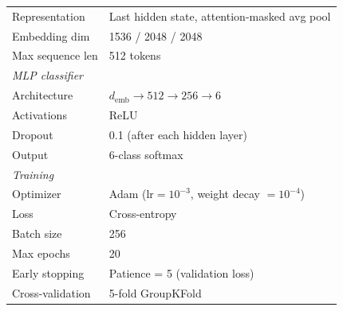 \begin{table}[t]
\begin{minipage}[t]{0.52\textwidth}
{\begin{tabular}{ll}
    Representation    & Last hidden state, attention-masked avg pool \\
    Embedding dim     & 1536 / 2048 / 2048 \\
    Max sequence len   & 512 tokens \\
    \midrule
    \multicolumn{2}{l}{\textit{MLP classifier}} \\
    Architecture      & $d_{\text{emb}} \to 512 \to 256 \to 6$ \\
    Activations       & ReLU \\
    Dropout           & 0.1 (after each hidden layer) \\
    Output            & 6-class softmax \\
    \midrule
    \multicolumn{2}{l}{\textit{Training}} \\
    Optimizer         & Adam ($\text{lr} = 10^{-3}$, weight decay $= 10^{-4}$) \\
    Loss              & Cross-entropy \\
    Batch size        & 256 \\
    Max epochs        & 20 \\
    Early stopping    & Patience = 5 (validation loss) \\
    Cross-validation  & 5-fold GroupKFold \\
    \bottomrule
  \end{tabular}%
  }
\end{minipage}
\end{table}

\begin{table}[t]
  \centering
  \scriptsize
  \caption{Pairwise AUC with bootstrap 95\% CIs for four of six primary configurations (1{,}000 resamples). All boundary pairs ($\auc > \theta$) $p < 0.01$; OLMo 1v2--4v5 non-significant ($p > 0.09$).}
  \label{tab:s8_cv_folds}
\end{table}

